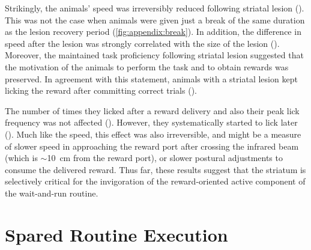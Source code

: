 Strikingly, the animals' speed was irreversibly reduced following striatal lesion ().
This was not the case when animals were given just a break of the same duration as the lesion recovery period (\autoref{fig:appendix:break}).
In addition, the difference in speed after the lesion was strongly correlated with the size of the lesion ().
Moreover, the maintained task proficiency following striatal lesion suggested that the motivation of the animals to perform the task and to obtain rewards was preserved.
In agreement with this statement, animals with a striatal lesion kept licking the reward after committing correct trials ().

The number of times they licked after a reward delivery and also their peak lick frequency was not affected ().
However, they systematically started to lick later ().
Much like the speed, this effect was also irreversible, and might be a measure of slower speed in approaching the reward port after crossing the infrared beam (which is $\sim$10~cm from the reward port), or slower postural adjustments to consume the delivered reward.
Thus far, these results suggest that the striatum is selectively critical for the invigoration of the reward-oriented active component of the wait-and-run routine.


\section{Spared Routine Execution}
\label{ch:lesion:rev}

